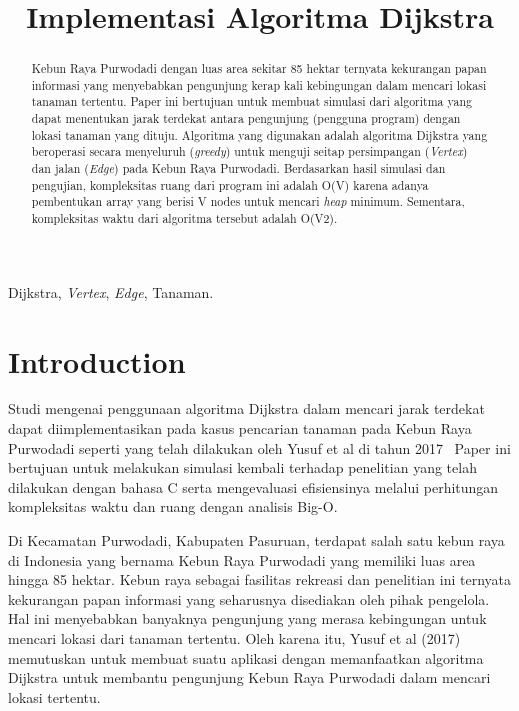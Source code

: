 \documentclass[conference]{IEEEtran}
\title{Implementasi Algoritma Dijkstra}
\author{\IEEEauthorblockN{Diandra Ramadhani}
\IEEEauthorblockA{\textit{School of Electrical Engineering and Informatics}\\
\textit{Institut Teknologi Bandung}\\
Bandung, Indonesia\\
Email: @std.stei.itb.ac.id}
}
\begin{document}
\maketitle


\begin{abstract}
    Kebun Raya Purwodadi dengan luas area sekitar 85
hektar ternyata kekurangan papan informasi yang menyebabkan
pengunjung kerap kali kebingungan dalam mencari lokasi tanaman tertentu. Paper ini bertujuan untuk membuat simulasi
dari algoritma yang dapat menentukan jarak terdekat antara
pengunjung (pengguna program) dengan lokasi tanaman yang
dituju. Algoritma yang digunakan adalah algoritma Dijkstra
yang beroperasi secara menyeluruh (\emph{greedy}) untuk menguji
seitap persimpangan (\emph{Vertex}) dan jalan (\emph{Edge}) pada Kebun
Raya Purwodadi. Berdasarkan hasil simulasi dan pengujian,
kompleksitas ruang dari program ini adalah O(V) karena adanya
pembentukan array yang berisi V nodes untuk mencari \emph{heap} minimum. Sementara, kompleksitas waktu dari algoritma tersebut
adalah O(V2).
\end{abstract}

\begin{IEEEkeywords}
    Dijkstra, \emph{Vertex}, \emph{Edge}, Tanaman.
\end{IEEEkeywords}

\section{Introduction}
Studi mengenai penggunaan algoritma Dijkstra dalam mencari jarak terdekat dapat diimplementasikan pada kasus pencarian tanaman pada Kebun Raya Purwodadi seperti yang telah
dilakukan oleh Yusuf et al di tahun 2017~\cite{j-ptiik}
Paper ini bertujuan untuk melakukan simulasi kembali terhadap penelitian
yang telah dilakukan dengan bahasa C serta mengevaluasi
efisiensinya melalui perhitungan kompleksitas waktu dan ruang dengan analisis Big-O.

Di Kecamatan Purwodadi, Kabupaten Pasuruan, terdapat
salah satu kebun raya di Indonesia yang bernama Kebun
Raya Purwodadi yang memiliki luas area hingga 85 hektar.
Kebun raya sebagai fasilitas rekreasi dan penelitian ini ternyata
kekurangan papan informasi yang seharusnya disediakan oleh
pihak pengelola. Hal ini menyebabkan banyaknya pengunjung
yang merasa kebingungan untuk mencari lokasi dari tanaman
tertentu. Oleh karena itu, Yusuf et al (2017) memutuskan
untuk membuat suatu aplikasi dengan memanfaatkan algoritma
Dijkstra untuk membantu pengunjung Kebun Raya Purwodadi
dalam mencari lokasi tertentu. 
\end{document}
